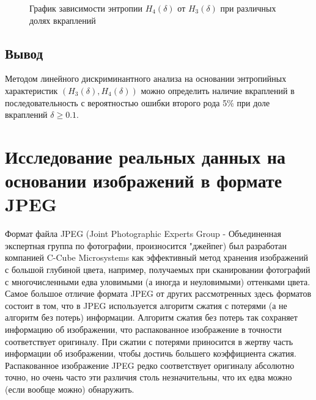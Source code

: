 \documentclass[a4paper,12pt]{article}
\theoremstyle{plain}
\begin{document}
	\begin{figure}[h]
		\caption{График зависимости энтропии $H_4{(\delta)}$ от $H_3{(\delta)}$ при различных долях вкраплений}
		\label{ris:"lda.png"}
	\end{figure}
	\newpage
\subsection{Вывод}
Методом линейного дискриминантного анализа на основании энтропийных характеристик $(H_3(\delta), H_4(\delta))$ можно определить наличие вкраплений в последовательность с вероятностью ошибки второго рода 5\% при доле вкраплений $\delta \geq 0.1$.





\clearpage
\newpage
\section{Исследование реальных данных на основании изображений в формате JPEG}
Формат файла JPEG (Joint Photographic Experts Group - Объединенная экспертная группа по фотографии, произносится "джейпег) был разработан компанией C-Cube Microsystems как эффективный метод хранения изображений с большой глубиной цвета, например, получаемых при сканировании фотографий с многочисленными едва уловимыми (а иногда и неуловимыми) оттенками цвета. Самое большое отличие формата JPEG от других рассмотренных здесь форматов состоит в том, что в JPEG используется алгоритм сжатия с потерями (а не алгоритм без потерь) информации. Алгоритм сжатия без потерь так сохраняет информацию об изображении, что распакованное изображение в точности соответствует оригиналу. При сжатии с потерями приносится в жертву часть информации об изображении, чтобы достичь большего коэффициента сжатия. Распакованное изображение JPEG редко соответствует оригиналу абсолютно точно, но очень часто эти различия столь незначительны, что их едва можно (если вообще можно) обнаружить.
\end{document}
